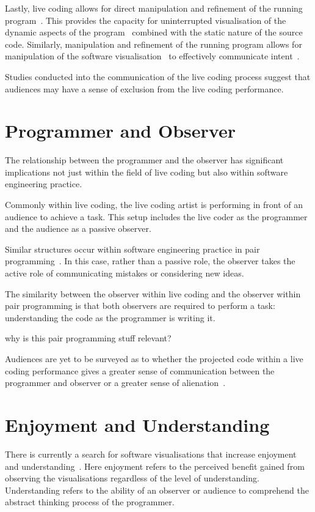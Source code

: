 Lastly, live coding allows for direct manipulation and refinement of the running program~\cite{Swift2013}. This provides the capacity for uninterrupted visualisation of the dynamic aspects of the program~ combined with the static nature of the source code. Similarly, manipulation and refinement of the running program allows for manipulation of the software visualisation~\cite{McLean2010a} to effectively communicate intent~.

{\color{red} Studies conducted into the communication of the live coding process suggest that audiences may have a sense of exclusion from the live coding performance.}

\section{Programmer and Observer}

The relationship between the programmer and the observer has significant implications not just within the field of live coding but also within software engineering practice.

Commonly within live coding, the live coding artist is performing in front of an audience to achieve a task. This setup includes the live coder as the programmer and the audience as a passive observer. 

Similar structures occur within software engineering practice in pair programming~. In this case, rather than a passive role, the observer takes the active role of communicating mistakes or considering new ideas.

The similarity between the observer within live coding and the observer within pair programming is that both observers are required to perform a task: understanding the code as the programmer is writing it.

{\color{red} why is this pair programming stuff relevant?}

Audiences are yet to be surveyed as to whether the projected code within a live coding performance gives a greater sense of communication between the programmer and observer or a greater sense of alienation~\cite{Mclean2011}.

\more

\section{Enjoyment and Understanding}

There is currently a search for software visualisations that increase enjoyment and understanding~\cite{McLean2010a}. Here enjoyment refers to the perceived benefit gained from observing the visualisations regardless of the level of understanding. Understanding refers to the ability of an observer or audience to comprehend the abstract thinking process of the programmer.


